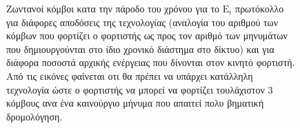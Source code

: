 \begin{figure}[H]
  \centering
  \caption{Ζωντανοί κόμβοι κατα την πάροδο του χρόνου για το $\text{E}_{i}$ πρωτόκολλο για διάφορες αποδόσεις της τεχνολογίας (αναλογία του αριθμού των κόμβων που
φορτίζει ο φορτιστής ως προς τον αριθμό των μηνυμάτων που δημιουργούνται στο ίδιο χρονικό διάστημα στο δίκτυο) και για διάφορα ποσοστά αρχικής ενέργειας που δίνονται
στον κινητό φορτιστή. Από τις εικόνες φαίνεται οτι θα πρέπει να υπάρχει κατάλληλη τεχνολογία ώστε ο φορτιστής να μπορεί να φορτίζει τουλάχιστον 3 κόμβους ανα ένα
καινούργιο μήνυμα που απαιτεί πολυ βηματική δρομολόγηση.}
  \label{fig:5exp_1_3}
\end{figure}
